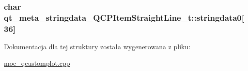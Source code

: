 \subsubsection[{\texorpdfstring{stringdata0}{stringdata0}}]{\setlength{\rightskip}{0pt plus 5cm}char qt\+\_\+meta\+\_\+stringdata\+\_\+\+Q\+C\+P\+Item\+Straight\+Line\+\_\+t\+::stringdata0\mbox{[}36\mbox{]}}\hypertarget{structqt__meta__stringdata___q_c_p_item_straight_line__t_a0e2c6dce44cbc1e13041b33cd138f25d}{}\label{structqt__meta__stringdata___q_c_p_item_straight_line__t_a0e2c6dce44cbc1e13041b33cd138f25d}


Dokumentacja dla tej struktury została wygenerowana z pliku\+:\begin{DoxyCompactItemize}
\item 
\hyperlink{moc__qcustomplot_8cpp}{moc\+\_\+qcustomplot.\+cpp}\end{DoxyCompactItemize}
